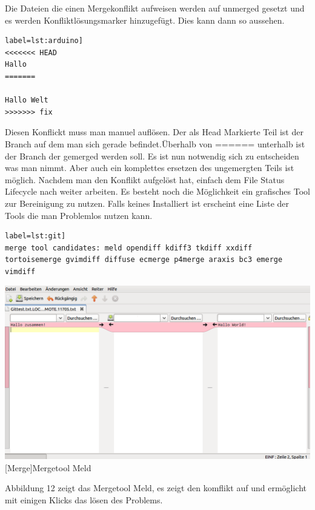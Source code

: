 \documentclass[12pt,a4paper,bibliography=totocnumbered,listof=totocnumbered]{scrartcl}
\begin{document}
Die Dateien die einen Mergekonflikt aufweisen werden auf unmerged gesetzt und es werden Konfliktlösungsmarker hinzugefügt. Dies kann dann so aussehen.  	
\begin{lstlisting}[caption=Branch Konfilkt] label=lst:arduino]
<<<<<<< HEAD
Hallo
=======

Hallo Welt
>>>>>>> fix
\end{lstlisting}

Diesen Konflickt muss man manuel auflösen. Der als Head Markierte Teil ist der Branch auf dem man sich gerade befindet.Überhalb von ====== unterhalb ist der Branch der gemerged werden soll. Es ist nun notwendig sich zu entscheiden was man nimmt. Aber auch ein komplettes ersetzen des ungemergten Teils ist möglich. Nachdem man den Konflikt aufgelöst hat, einfach dem File Status Lifecycle nach weiter arbeiten.
Es besteht noch die Möglichkeit ein grafisches Tool zur Bereinigung zu nutzen. Falls keines Installiert ist erscheint eine Liste der Tools die man Problemlos nutzen kann.
\begin{lstlisting}[caption=Merge Tools] label=lst:git]
merge tool candidates: meld opendiff kdiff3 tkdiff xxdiff tortoisemerge gvimdiff diffuse ecmerge p4merge araxis bc3 emerge vimdiff
\end{lstlisting}

\vspace{1em}
\begin{minipage}{\linewidth}
	\centering
	\includegraphics[width=0.6\linewidth]{Bilder/mergetool.png}
	[Merge]{Mergetool Meld\footnotemark }
	\label{fig:gitspeichern}
\end{minipage}

Abbildung 12 zeigt das Mergetool Meld, es zeigt den komflikt auf und ermöglicht mit einigen Klicks das lösen des Problems.
\end{document}
